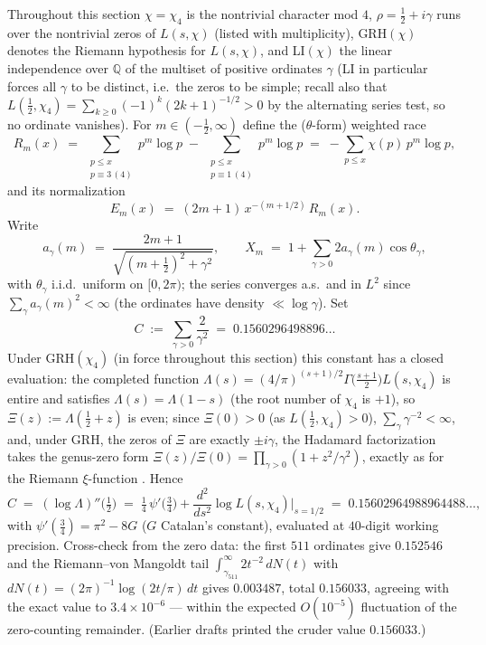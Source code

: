 Throughout this section $\chi=\chi_4$ is the nontrivial character mod
$4$, $\rho=\tfrac12+i\gamma$ runs over the nontrivial zeros of
$L(s,\chi)$ (listed with multiplicity), GRH$(\chi)$ denotes the Riemann
hypothesis for $L(s,\chi)$, and LI$(\chi)$ the linear independence over
$\mathbb Q$ of the multiset of positive ordinates $\gamma$ (LI in
particular forces all $\gamma$ to be distinct, i.e.\ the zeros to be
simple; recall also that $L(\tfrac12,\chi_4)=\sum_{k\ge0}(-1)^k(2k+1)^{-1/2}>0$
by the alternating series test, so no ordinate vanishes). For
$m\in(-\tfrac12,\infty)$ define the ($\theta$-form) weighted race
\[
R_m(x)\;=\;\sum_{\substack{p\le x\\ p\equiv3\,(4)}}p^m\log p
\;-\;\sum_{\substack{p\le x\\ p\equiv1\,(4)}}p^m\log p
\;=\;-\sum_{p\le x}\chi(p)\,p^m\log p ,
\]
and its normalization
\[
E_m(x)\;=\;(2m+1)\,x^{-(m+1/2)}\,R_m(x).
\]
Write
\[
a_\gamma(m)\;=\;\frac{2m+1}{\sqrt{(m+\tfrac12)^2+\gamma^2}},
\qquad
X_m\;=\;1+\sum_{\gamma>0}2a_\gamma(m)\cos\theta_\gamma ,
\]
with $\theta_\gamma$ i.i.d.\ uniform on $[0,2\pi)$; the series converges
a.s.\ and in $L^2$ since $\sum_\gamma a_\gamma(m)^2<\infty$ (the ordinates
have density $\ll\log\gamma$). Set
\[
C\;:=\;\sum_{\gamma>0}\frac{2}{\gamma^2}\;=\;0.1560296498896\ldots
\]
Under GRH$(\chi_4)$ (in force throughout this section) this constant has
a closed evaluation: the completed function
$\Lambda(s)=(4/\pi)^{(s+1)/2}\Gamma\bigl(\tfrac{s+1}{2}\bigr)L(s,\chi_4)$
is entire and satisfies $\Lambda(s)=\Lambda(1-s)$ (the root number of
$\chi_4$ is $+1$), so $\Xi(z):=\Lambda(\tfrac12+z)$ is even; since
$\Xi(0)>0$ (as $L(\tfrac12,\chi_4)>0$), $\sum_\gamma\gamma^{-2}<\infty$,
and, under GRH, the zeros of $\Xi$ are exactly $\pm i\gamma$, the
Hadamard factorization takes the genus-zero form
$\Xi(z)/\Xi(0)=\prod_{\gamma>0}(1+z^2/\gamma^2)$, exactly as for the
Riemann $\xi$-function \cite[\S12]{Dav00}. Hence
\[
C\;=\;(\log\Lambda)''\bigl(\tfrac12\bigr)
\;=\;\tfrac14\,\psi'\bigl(\tfrac34\bigr)
+\frac{d^2}{ds^2}\log L(s,\chi_4)\Big|_{s=1/2}
\;=\;0.15602964988964488\ldots,
\]
with $\psi'(\tfrac34)=\pi^2-8G$ ($G$ Catalan's constant), evaluated at
$40$-digit working precision. Cross-check from the zero data: the first
$511$ ordinates give $0.152546$ and the Riemann--von Mangoldt tail
$\int_{\gamma_{511}}^\infty 2t^{-2}\,dN(t)$ with
$dN(t)=(2\pi)^{-1}\log(2t/\pi)\,dt$ gives $0.003487$, total $0.156033$,
agreeing with the exact value to $3.4\times10^{-6}$ --- within the
expected $O(10^{-5})$ fluctuation of the zero-counting remainder.
(Earlier drafts printed the cruder value $0.156033$.)


